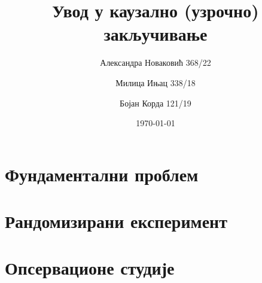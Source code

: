 \documentclass[12pt, a4paper]{article}
\title{Увод у каузално (узрочно) закључивање}
\author{Александра Новаковић 368/22}
\author{Милица Ињац 338/18}
\author{Бојан Корда 121/19}
\affil{Математички факултет, Универзитет у Београду}
\date{\today}
\begin{document}
\maketitle
\newpage

\tableofcontents
\newpage

\section{Фундаментални проблем}
\newpage



\section{Рандомизирани експеримент}
\newpage



\section{Опсервационе студије}
\end{document}

